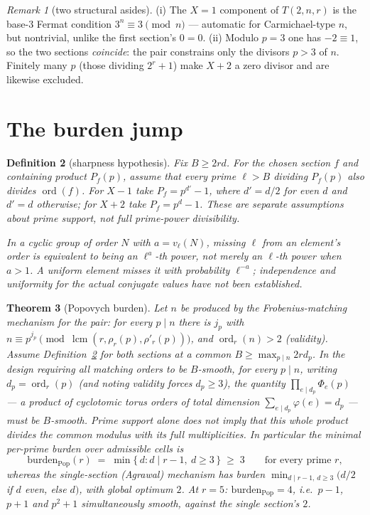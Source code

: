 \documentclass[11pt]{article}
\newtheorem{theorem}{Theorem}
\newtheorem{definition}[theorem]{Definition}
\theoremstyle{remark}
\newtheorem{remark}[theorem]{Remark}
\DeclareMathOperator{\lcm}{lcm}
\DeclareMathOperator{\ord}{ord}
\begin{document}
\begin{remark}[two structural asides]\label{rem:asides}
(i) The $X = 1$ component of $T(2, n, r)$ is the base-$3$ Fermat
condition $3^n \equiv 3 \pmod n$ --- automatic for Carmichael-type $n$,
but nontrivial, unlike the first section's $0 = 0$. (ii) Modulo $p = 3$
one has $-2 \equiv 1$, so the two sections \emph{coincide}: the pair
constrains only the divisors $p > 3$ of $n$. Finitely many $p$ (those
dividing $2^r + 1$) make $X + 2$ a zero divisor and are likewise
excluded.
\end{remark}

\section{The burden jump}

\begin{definition}[sharpness hypothesis]\label{def:sharp}
Fix $B\ge2rd$. For the chosen section $f$ and containing product $P_f(p)$,
assume that every prime $\ell>B$ dividing $P_f(p)$ also divides $\ord(f)$.
For $X-1$ take $P_f=p^{d'}-1$, where $d'=d/2$ for even $d$ and $d'=d$
otherwise; for $X+2$ take $P_f=p^d-1$. These are separate assumptions
about prime support, not full prime-power divisibility.

In a cyclic group of order $N$ with $a=v_\ell(N)$, missing $\ell$ from
an element's order is equivalent to being an $\ell^a$-th power, not merely
an $\ell$-th power when $a>1$. A uniform element misses it with
probability $\ell^{-a}$; independence and uniformity for the actual
conjugate values have not been established.
\end{definition}

\begin{theorem}[Popovych burden]\label{thm:burden}
Let $n$ be produced by the Frobenius-matching mechanism for the pair:
for every $p \mid n$ there is $j_p$ with $n \equiv p^{j_p} \pmod{
\lcm(r, \rho_r(p), \rho'_r(p))}$, and $\ord_r(n) > 2$ (validity).
Assume Definition~\ref{def:sharp} for both sections at a common
$B\ge\max_{p\mid n}2rd_p$. In the design requiring all matching orders
to be $B$-smooth, for every $p\mid n$,
writing $d_p = \ord_r(p)$ (and noting validity forces $d_p \ge 3$),
the quantity $\prod_{e \mid d_p} \Phi_e(p)$ --- a product of cyclotomic
torus orders of total dimension $\sum_{e \mid d_p}\varphi(e) = d_p$ ---
must be $B$-smooth. Prime support alone does not imply that this whole product
divides the common modulus with its full multiplicities. In
particular the minimal per-prime burden over admissible cells is
\[
\mathrm{burden}_{\mathrm{Pop}}(r) \;=\; \min\{\, d : d \mid r - 1,\
d \ge 3 \,\} \;\ge\; 3 \qquad \text{for every prime } r,
\]
whereas the single-section (Agrawal) mechanism has burden
$\min_{d \mid r-1,\, d \ge 3}(d/2$ if $d$ even, else $d)$, with global
optimum $2$. At $r = 5$: $\mathrm{burden}_{\mathrm{Pop}} = 4$, i.e.\
$p - 1$, $p + 1$ and $p^2 + 1$ simultaneously smooth, against the
single section's $2$.
\end{theorem}
\end{document}
